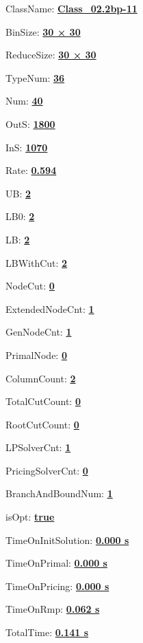 \documentclass[11pt]{article}
\begin{document}
\pagestyle{empty}


ClassName: \underline{\textbf{Class_02.2bp-11}}
\par
BinSize: \underline{\textbf{30 × 30}}
\par
ReduceSize: \underline{\textbf{30 × 30}}
\par
TypeNum: \underline{\textbf{36}}
\par
Num: \underline{\textbf{40}}
\par
OutS: \underline{\textbf{1800}}
\par
InS: \underline{\textbf{1070}}
\par
Rate: \underline{\textbf{0.594}}
\par
UB: \underline{\textbf{2}}
\par
LB0: \underline{\textbf{2}}
\par
LB: \underline{\textbf{2}}
\par
LBWithCut: \underline{\textbf{2}}
\par
NodeCut: \underline{\textbf{0}}
\par
ExtendedNodeCnt: \underline{\textbf{1}}
\par
GenNodeCnt: \underline{\textbf{1}}
\par
PrimalNode: \underline{\textbf{0}}
\par
ColumnCount: \underline{\textbf{2}}
\par
TotalCutCount: \underline{\textbf{0}}
\par
RootCutCount: \underline{\textbf{0}}
\par
LPSolverCnt: \underline{\textbf{1}}
\par
PricingSolverCnt: \underline{\textbf{0}}
\par
BranchAndBoundNum: \underline{\textbf{1}}
\par
isOpt: \underline{\textbf{true}}
\par
TimeOnInitSolution: \underline{\textbf{0.000 s}}
\par
TimeOnPrimal: \underline{\textbf{0.000 s}}
\par
TimeOnPricing: \underline{\textbf{0.000 s}}
\par
TimeOnRmp: \underline{\textbf{0.062 s}}
\par
TotalTime: \underline{\textbf{0.141 s}}
\par
\newpage
\end{document}
